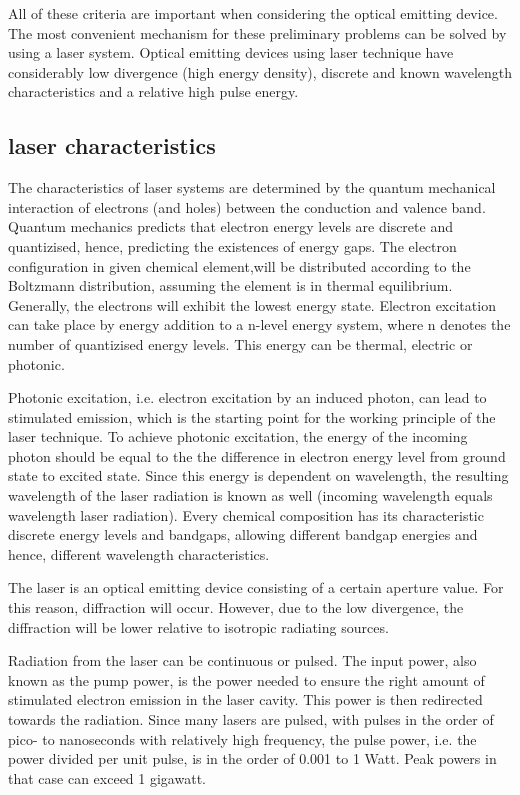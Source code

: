 All of these criteria are important when considering the optical emitting device. The most convenient mechanism for these preliminary problems can be solved by using a \ac{laser} system. Optical emitting devices using \acs{laser} technique have considerably low divergence (high energy density),  discrete and known wavelength characteristics and a relative high pulse energy.

\subsection{laser characteristics}\cite{quantumoptics}
	\label{blDOLSRchar}
The characteristics of \acs{laser} systems are determined by the quantum mechanical interaction of electrons (and holes) between the conduction and valence band. Quantum mechanics predicts that electron energy levels are discrete and quantizised, hence, predicting the existences of energy gaps. The electron configuration in given chemical element,will be distributed according to the Boltzmann distribution, assuming the element is in thermal equilibrium. Generally, the electrons will exhibit the lowest energy state. Electron excitation can take place by energy addition to a n-level energy system, where n denotes the number of quantizised energy levels. This energy can be thermal, electric or photonic. 

Photonic excitation, i.e. electron excitation by an induced photon, can lead to stimulated emission, which is the starting point for the working principle of the \acs{laser} technique. To achieve photonic excitation, the energy of the incoming photon should be equal to the the difference in electron energy level from ground state to excited state. Since this energy is dependent on wavelength, the resulting wavelength of the \acs{laser} radiation is known as well (incoming wavelength equals wavelength laser radiation). Every chemical composition has its characteristic discrete energy levels and bandgaps, allowing different bandgap energies and hence, different wavelength characteristics. 

The \acs{laser} is an optical emitting device consisting of a certain aperture value. For this reason, diffraction will occur. However, due to the low divergence, the diffraction will be lower relative to isotropic radiating sources.

Radiation from the \acs{laser} can be continuous or pulsed. The input power, also known as the pump power, is the power needed to ensure the right amount of stimulated electron emission in the \acs{laser} cavity. This power is then redirected towards the radiation. Since many \acs{laser}s are pulsed, with pulses in the order of pico- to nanoseconds with relatively high frequency, the pulse power, i.e. the power divided per unit pulse, is in the order of 0.001 to 1 Watt. Peak powers in that case can exceed 1 gigawatt.  

